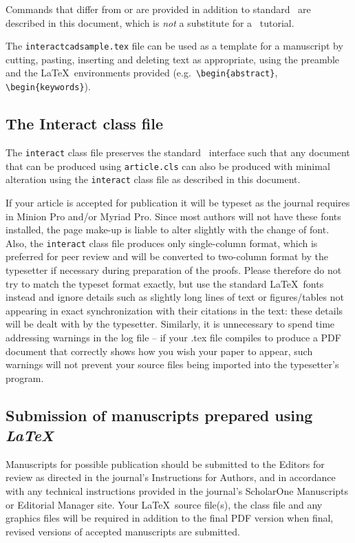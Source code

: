 \documentclass[]{interact}
\theoremstyle{plain}%
\theoremstyle{definition}
\theoremstyle{remark}
\begin{document}
Commands that differ from or are provided in addition to standard \LaTeXe\ are described in this document, which is \emph{not} a substitute for a \LaTeXe\ tutorial.

The \texttt{interactcadsample.tex} file can be used as a template for a manuscript by cutting, pasting, inserting and deleting text as appropriate, using the preamble and the \LaTeX\ environments provided (e.g.\ \verb"\begin{abstract}", \verb"\begin{keywords}").


\subsection{The \textsf{Interact} class file}\label{class}

The \texttt{interact} class file preserves the standard \LaTeXe\ interface such that any document that can be produced using \texttt{article.cls} can also be produced with minimal alteration using the \texttt{interact} class file as described in this document.

If your article is accepted for publication it will be typeset as the journal requires in Minion Pro and/or Myriad Pro. Since most authors will not have these fonts installed, the page make-up is liable to alter slightly with the change of font. Also, the \texttt{interact} class file produces only single-column format, which is preferred for peer review and will be converted to two-column format by the typesetter if necessary during preparation of the proofs. Please therefore do not try to match the typeset format exactly, but use the standard \LaTeX\ fonts instead and ignore details such as slightly long lines of text or figures/tables not appearing in exact synchronization with their citations in the text: these details will be dealt with by the typesetter. Similarly, it is unnecessary to spend time addressing warnings in the log file -- if your .tex file compiles to produce a PDF document that correctly shows how you wish your paper to appear, such warnings will not prevent your source files being imported into the typesetter's program.


\subsection{Submission of manuscripts prepared using \emph{\LaTeX}}

Manuscripts for possible publication should be submitted to the Editors for review as directed in the journal's Instructions for Authors, and in accordance with any technical instructions provided in the journal's ScholarOne Manuscripts or Editorial Manager site. Your \LaTeX\ source file(s), the class file and any graphics files will be required in addition to the final PDF version when final, revised versions of accepted manuscripts are submitted.
\end{document}
